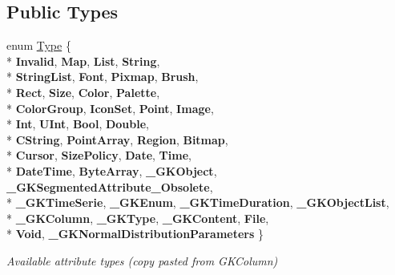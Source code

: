 \subsection*{Public Types}
\begin{DoxyCompactItemize}
\item 
enum \hyperlink{classADynamicAPISetup_a0ffce2ed1acaeaf1f058fab833e375c3}{Type} \{ \\*
{\bfseries Invalid}, 
{\bfseries Map}, 
{\bfseries List}, 
{\bfseries String}, 
\\*
{\bfseries String\+List}, 
{\bfseries Font}, 
{\bfseries Pixmap}, 
{\bfseries Brush}, 
\\*
{\bfseries Rect}, 
{\bfseries Size}, 
{\bfseries Color}, 
{\bfseries Palette}, 
\\*
{\bfseries Color\+Group}, 
{\bfseries Icon\+Set}, 
{\bfseries Point}, 
{\bfseries Image}, 
\\*
{\bfseries Int}, 
{\bfseries U\+Int}, 
{\bfseries Bool}, 
{\bfseries Double}, 
\\*
{\bfseries C\+String}, 
{\bfseries Point\+Array}, 
{\bfseries Region}, 
{\bfseries Bitmap}, 
\\*
{\bfseries Cursor}, 
{\bfseries Size\+Policy}, 
{\bfseries Date}, 
{\bfseries Time}, 
\\*
{\bfseries Date\+Time}, 
{\bfseries Byte\+Array}, 
{\bfseries \+\_\+\+G\+K\+Object}, 
{\bfseries \+\_\+\+G\+K\+Segmented\+Attribute\+\_\+\+Obsolete}, 
\\*
{\bfseries \+\_\+\+G\+K\+Time\+Serie}, 
{\bfseries \+\_\+\+G\+K\+Enum}, 
{\bfseries \+\_\+\+G\+K\+Time\+Duration}, 
{\bfseries \+\_\+\+G\+K\+Object\+List}, 
\\*
{\bfseries \+\_\+\+G\+K\+Column}, 
{\bfseries \+\_\+\+G\+K\+Type}, 
{\bfseries \+\_\+\+G\+K\+Content}, 
{\bfseries File}, 
\\*
{\bfseries Void}, 
{\bfseries \+\_\+\+G\+K\+Normal\+Distribution\+Parameters}
 \}\hypertarget{classADynamicAPISetup_a0ffce2ed1acaeaf1f058fab833e375c3}{}\label{classADynamicAPISetup_a0ffce2ed1acaeaf1f058fab833e375c3}
\begin{DoxyCompactList}\small\item\em Available attribute types (copy pasted from G\+K\+Column) \end{DoxyCompactList}
\end{DoxyCompactItemize}
